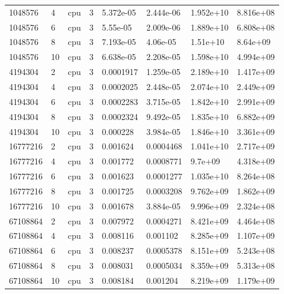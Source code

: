 \begin{tabular}{llllllll}
1048576 & 4 & cpu & 3 & 5.372e-05 & 2.444e-06 & 1.952e+10 & 8.816e+08 \\
1048576 & 6 & cpu & 3 & 5.55e-05 & 2.009e-06 & 1.889e+10 & 6.808e+08 \\
1048576 & 8 & cpu & 3 & 7.193e-05 & 4.06e-05 & 1.51e+10 & 8.64e+09 \\
1048576 & 10 & cpu & 3 & 6.638e-05 & 2.208e-05 & 1.598e+10 & 4.994e+09 \\
4194304 & 2 & cpu & 3 & 0.0001917 & 1.259e-05 & 2.189e+10 & 1.417e+09 \\
4194304 & 4 & cpu & 3 & 0.0002025 & 2.448e-05 & 2.074e+10 & 2.449e+09 \\
4194304 & 6 & cpu & 3 & 0.0002283 & 3.715e-05 & 1.842e+10 & 2.991e+09 \\
4194304 & 8 & cpu & 3 & 0.0002324 & 9.492e-05 & 1.835e+10 & 6.882e+09 \\
4194304 & 10 & cpu & 3 & 0.000228 & 3.984e-05 & 1.846e+10 & 3.361e+09 \\
16777216 & 2 & cpu & 3 & 0.001624 & 0.0004468 & 1.041e+10 & 2.717e+09 \\
16777216 & 4 & cpu & 3 & 0.001772 & 0.0008771 & 9.7e+09 & 4.318e+09 \\
16777216 & 6 & cpu & 3 & 0.001623 & 0.0001277 & 1.035e+10 & 8.264e+08 \\
16777216 & 8 & cpu & 3 & 0.001725 & 0.0003208 & 9.762e+09 & 1.862e+09 \\
16777216 & 10 & cpu & 3 & 0.001678 & 3.884e-05 & 9.996e+09 & 2.324e+08 \\
67108864 & 2 & cpu & 3 & 0.007972 & 0.0004271 & 8.421e+09 & 4.464e+08 \\
67108864 & 4 & cpu & 3 & 0.008116 & 0.001102 & 8.285e+09 & 1.107e+09 \\
67108864 & 6 & cpu & 3 & 0.008237 & 0.0005378 & 8.151e+09 & 5.243e+08 \\
67108864 & 8 & cpu & 3 & 0.008031 & 0.0005034 & 8.359e+09 & 5.313e+08 \\
67108864 & 10 & cpu & 3 & 0.008184 & 0.001204 & 8.219e+09 & 1.179e+09 \\
\hline
\end{tabular}
